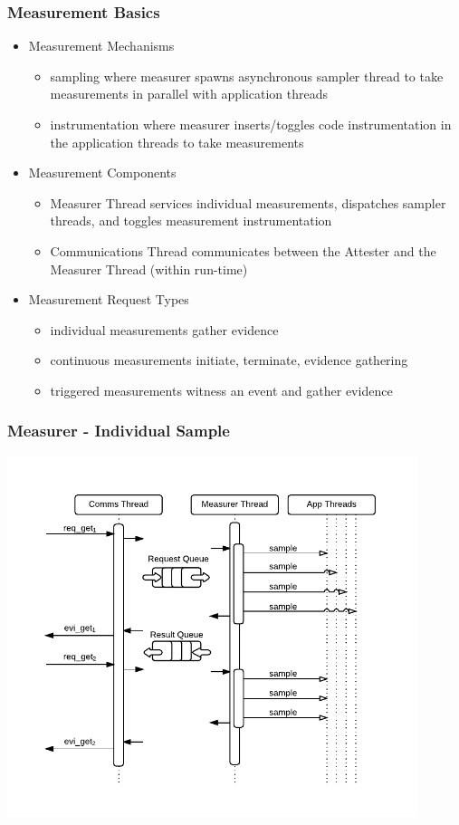 \documentclass{beamer}
\begin{document}
\begin{frame}
  \frametitle{Measurement Basics}
  \begin{itemize}
  \item Measurement Mechanisms
    \begin{itemize}
    \item sampling where measurer spawns asynchronous sampler thread to take measurements in parallel with application threads
    \item instrumentation where measurer inserts/toggles code instrumentation in the application threads to take measurements
    \end{itemize}    
   \item Measurement Components 
    \begin{itemize}
    \item Measurer Thread services individual measurements, dispatches sampler threads, and toggles measurement instrumentation
    \item Communications Thread communicates between the Attester and the Measurer Thread (within run-time)
    \end{itemize}    
   \item Measurement Request Types 
    \begin{itemize}
    \item individual measurements gather evidence
    \item continuous measurements initiate, terminate, evidence gathering
    \item triggered measurements witness an event and gather evidence
    \end{itemize}
  \end{itemize}
\end{frame}

\begin{frame}
  \frametitle{Measurer - Individual Sample}
  \begin{center}
  \includegraphics[width=0.9\textwidth]{figures/Measurer_Basic.pdf}
  \end{center}  
\end{frame}
\end{document}
